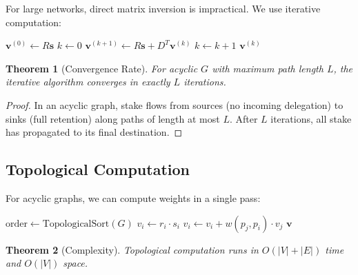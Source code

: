 \documentclass[11pt,a4paper]{article}
\newtheorem{theorem}{Theorem}
\begin{document}
For large networks, direct matrix inversion is impractical. We use iterative computation:

\begin{algorithm}
\caption{Iterative Vote Weight Computation}
\begin{algorithmic}[1]
    \State $\mathbf{v}^{(0)} \gets R\mathbf{s}$ 
    \State $k \gets 0$
    \Repeat
        \State $\mathbf{v}^{(k+1)} \gets R\mathbf{s} + D^T \mathbf{v}^{(k)}$
        \State $k \gets k + 1$
    \State \Return $\mathbf{v}^{(k)}$
\EndProcedure
\end{algorithmic}
\end{algorithm}

\begin{theorem}[Convergence Rate]
For acyclic $G$ with maximum path length $L$, the iterative algorithm converges in exactly $L$ iterations.
\end{theorem}

\begin{proof}
In an acyclic graph, stake flows from sources (no incoming delegation) to sinks (full retention) along paths of length at most $L$. After $L$ iterations, all stake has propagated to its final destination.
\end{proof}

\subsection{Topological Computation}

For acyclic graphs, we can compute weights in a single pass:

\begin{algorithm}
\caption{Topological Vote Weight Computation}
\begin{algorithmic}[1]
    \State $\text{order} \gets \text{TopologicalSort}(G)$ 
        \State $v_i \gets r_i \cdot s_i$ 
         
            \State $v_i \gets v_i + w(p_j, p_i) \cdot v_j$
        \EndFor
    \EndFor
    \State \Return $\mathbf{v}$
\EndProcedure
\end{algorithmic}
\end{algorithm}

\begin{theorem}[Complexity]
Topological computation runs in $O(|V| + |E|)$ time and $O(|V|)$ space.
\end{theorem}
\end{document}
